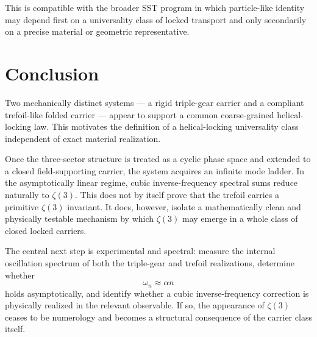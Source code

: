 \documentclass[11pt]{article}
\begin{document}
    This is compatible with the broader SST program in which particle-like identity may depend first on a universality class of locked transport and only secondarily on a precise material or geometric representative.
    
    \section{Conclusion}
    
    Two mechanically distinct systems --- a rigid triple-gear carrier and a compliant trefoil-like folded carrier --- appear to support a common coarse-grained helical-locking law. This motivates the definition of a helical-locking universality class independent of exact material realization.
    
    Once the three-sector structure is treated as a cyclic phase space and extended to a closed field-supporting carrier, the system acquires an infinite mode ladder. In the asymptotically linear regime, cubic inverse-frequency spectral sums reduce naturally to \(\zeta(3)\). This does not by itself prove that the trefoil carries a primitive \(\zeta(3)\) invariant. It does, however, isolate a mathematically clean and physically testable mechanism by which \(\zeta(3)\) may emerge in a whole class of closed locked carriers.
    
    The central next step is experimental and spectral: measure the internal oscillation spectrum of both the triple-gear and trefoil realizations, determine whether
    \begin{equation}
        \omega_n \approx \alpha n
    \end{equation}
    holds asymptotically, and identify whether a cubic inverse-frequency correction is physically realized in the relevant observable. If so, the appearance of \(\zeta(3)\) ceases to be numerology and becomes a structural consequence of the carrier class itself.
\end{document}
